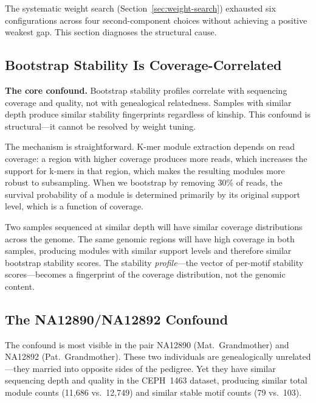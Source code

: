 \documentclass{../yalumba}
\begin{document}
The systematic weight search (Section~\ref{sec:weight-search}) exhausted six
configurations across four second-component choices without achieving a positive
weakest gap.  This section diagnoses the structural cause.

\subsection{Bootstrap Stability Is Coverage-Correlated}

\begin{limitation}
\textbf{The core confound.}  Bootstrap stability profiles correlate with
sequencing coverage and quality, not with genealogical relatedness.  Samples
with similar depth produce similar stability fingerprints regardless of kinship.
This confound is structural---it cannot be resolved by weight tuning.
\end{limitation}

The mechanism is straightforward.  K-mer module extraction depends on read
coverage: a region with higher coverage produces more reads, which increases
the support for k-mers in that region, which makes the resulting modules more
robust to subsampling.  When we bootstrap by removing 30\% of reads, the
survival probability of a module is determined primarily by its original
support level, which is a function of coverage.


Two samples sequenced at similar depth will have similar coverage distributions
across the genome.  The same genomic regions will have high coverage in both
samples, producing modules with similar support levels and therefore similar
bootstrap stability scores.  The stability \emph{profile}---the vector of
per-motif stability scores---becomes a fingerprint of the coverage
distribution, not the genomic content.

\subsection{The NA12890/NA12892 Confound}

The confound is most visible in the pair NA12890 (Mat.\ Grandmother) and
NA12892 (Pat.\ Grandmother).  These two individuals are genealogically
unrelated---they married into opposite sides of the pedigree.  Yet they have
similar sequencing depth and quality in the CEPH~1463 dataset, producing
similar total module counts (11{,}686 vs.\ 12{,}749) and similar stable motif
counts (79 vs.\ 103).
\end{document}
